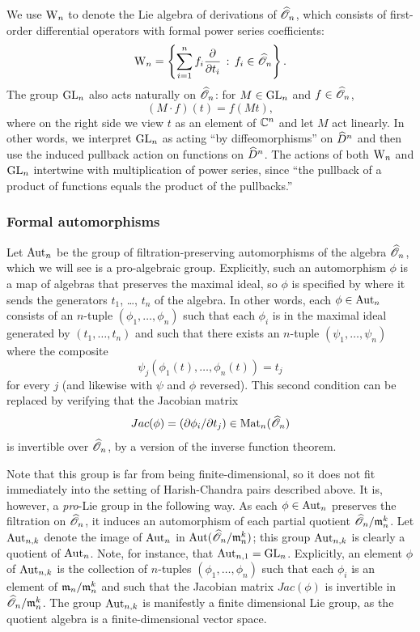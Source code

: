 We use ${{\rm W}_n}$ to denote the Lie algebra of derivations of $\widehat{\mathscr O}_n$, which consists of first-order differential operators with formal power series coefficients:
\[
{{\rm W}_n} = \left\{ \sum_{i =1 }^n f_i \frac{\partial}{\partial t_i} \,:\, f_i \in \widehat{\mathscr O}_n\right\}.
\]
The group ${\rm GL}_n$ also acts naturally on $\widehat{\mathscr O}_n$: for $M \in {\rm GL}_n$ and $f \in \widehat{\mathscr O}_n$,
\[
(M \cdot f)(t) = f (Mt),
\]
where on the right side we view $t$ as an element of $\mathbb C^n$ and let $M$ act linearly.
In other words, we interpret ${\rm GL}_n$ as acting ``by diffeomorphisms'' on $\widehat{D}^n$ and then use the induced pullback action on functions on $\widehat{D}^n$.
The actions of both ${{\rm W}_n}$ and ${\rm GL}_n$ intertwine with multiplication of power series, 
since ``the pullback of a product of functions equals the product of the pullbacks.''

\subsubsection{Formal automorphisms}

Let ${\rm Aut}_n$ be the group of filtration-preserving automorphisms of the algebra $\widehat{\mathscr O}_n$,
which we will see is a pro-algebraic group.
Explicitly, such an automorphism $\phi$ is a map of algebras that preserves the maximal ideal, 
so $\phi$ is specified by where it sends the generators $t_1$, \dots, $t_n$ of the algebra.
In other words, each $\phi \in {\rm Aut}_n$ consists of an $n$-tuple $(\phi_1,\ldots,\phi_n)$ 
such that each $\phi_i$ is in the maximal ideal generated by $(t_1,\ldots,t_n)$ and such that there exists an $n$-tuple $(\psi_1,\ldots,\psi_n)$ 
where the composite
\[
\psi_j(\phi_1(t),\ldots,\phi_n(t)) = t_j
\]
for every $j$ (and likewise with $\psi$ and $\phi$ reversed).
This second condition can be replaced by verifying that the Jacobian matrix
\[
Jac(\phi) = (\partial \phi_i/\partial t_j) \in {\rm Mat}_n(\widehat{\mathscr O}_n)
\]
is invertible over $\widehat{\mathscr O}_n$, by a version of the inverse function theorem.

Note that this group is far from being finite-dimensional, so it does not fit immediately into the setting of Harish-Chandra pairs described above. 
It is, however, a {\em pro}-Lie group in the following way. 
As each $\phi \in {\rm Aut}_n$ preserves the filtration on $\widehat{\mathscr O}_n$, it induces an automorphism of each partial quotient $\widehat{\mathscr O}_n/{\mathfrak m}_n^k$.
Let ${\rm Aut}_{n,k}$ denote the image of ${\rm Aut}_n$ in ${\rm Aut}(\widehat{\mathscr O}_n/{\mathfrak m}_n^k)$; this group ${\rm Aut}_{n,k}$ is clearly a quotient of ${\rm Aut}_n$.
Note, for instance, that ${\rm Aut}_{n,1} = {\rm GL}_n$.
Explicitly, an element $\phi$ of ${\rm Aut}_{n,k}$ is the collection of $n$-tuples $(\phi_1,\ldots,\phi_n)$ 
such that each $\phi_i$ is an element of ${\mathfrak m}_n/{\mathfrak m}_n^k$ and such that the Jacobian matrix $Jac(\phi)$ is invertible in $\widehat{\mathscr O}_n/{\mathfrak m}_n^k$.
The group ${\rm Aut}_{n,k}$ is manifestly a finite dimensional Lie group, as the quotient algebra is a finite-dimensional vector space. 
 
